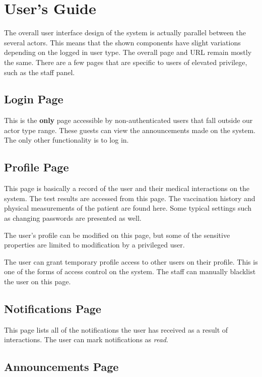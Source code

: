 \documentclass[a4paper, 12pt, titlepage]{article}
\begin{document}
  \pagebreak
  \section{User's Guide}

  The overall user interface design of the system is actually parallel between the several actors.
  This means that the shown components have slight variations depending on the logged in user type.
  The overall page and URL remain mostly the same.
  There are a few pages that are specific to users of elevated privilege, such as the staff panel.
  
  \subsection{Login Page}
  
  This is the \textbf{only} page accessible by non-authenticated users
  that fall outside our actor type range.
  These guests can view the announcements made on the system.
  The only other functionality is to log in.
  
  \subsection{Profile Page}
  
  This page is basically a record of the user and their medical interactions on the system.
  The test results are accessed from this page.
  The vaccination history and physical measurements of the patient are found here.
  Some typical settings such as changing passwords are presented as well.
  
  The user's profile can be modified on this page, but some of the sensitive properties
  are limited to modification by a privileged user.
  
  The user can grant temporary profile access to other users on their profile.
  This is one of the forms of access control on the system.
  The staff can manually blacklist the user on this page.
  
  \subsection{Notifications Page}
  
  This page lists all of the notifications the user has received as a result of interactions.
  The user can mark notifications as \textit{read}.
  
  \subsection{Announcements Page}
  
\end{document}
